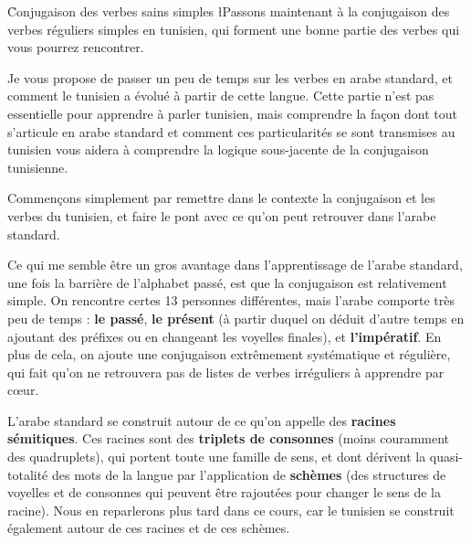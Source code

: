 \h{Conjugaison des verbes sains simples}
\label{ConjSS}
\l{P}assons maintenant à la conjugaison des verbes réguliers simples en tunisien, qui forment une bonne partie des verbes qui vous pourrez rencontrer.

Je vous propose de passer un peu de temps sur les verbes en arabe standard, et comment le tunisien a évolué à partir de cette langue. Cette partie n'est pas essentielle pour apprendre à parler tunisien, mais comprendre la façon dont tout s'articule en arabe standard et comment ces particularités se sont transmises au tunisien vous aidera à comprendre la logique sous-jacente de la conjugaison tunisienne.

 \label{ConjSS1}
Commençons simplement par remettre dans le contexte la conjugaison et les verbes du tunisien, et faire le pont avec ce qu'on peut retrouver dans l'arabe standard.

Ce qui me semble être un gros avantage dans l'apprentissage de l'arabe standard, une fois la barrière de l'alphabet passé, est que la conjugaison est relativement simple. On rencontre certes 13 personnes différentes, mais l'arabe comporte très peu de temps : \textbf{le passé}, \textbf{le présent} (à partir duquel on déduit d'autre temps en ajoutant des préfixes ou en changeant les voyelles finales), et \textbf{l'impératif}. En plus de cela, on ajoute une conjugaison extrêmement systématique et régulière, qui fait qu'on ne retrouvera pas de listes de verbes irréguliers à apprendre par c\oe ur. 

L'arabe standard se construit autour de ce qu'on appelle des \textbf{racines sémitiques}. Ces racines sont des \textbf{triplets de consonnes} (moins couramment des quadruplets), qui portent toute une famille de sens, et dont dérivent la quasi-totalité des mots de la langue par l'application de \textbf{schèmes} (des structures de voyelles et de consonnes qui peuvent être rajoutées pour changer le sens de la racine). Nous en reparlerons plus tard dans ce cours, car le tunisien se construit également autour de ces racines et de ces schèmes.

